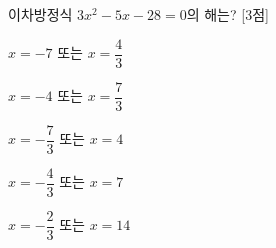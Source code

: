 이차방정식 $3x^2-5x-28=0$의 해는? \mbox{[3점]}
\begin{choicesii}{\rule[-3ex]{0pt}{8ex}$x=-7$ 또는 $x=\dfrac{4}{3}$}{\rule[-3ex]{0pt}{8ex}$x=-4$ 또는 $x=\dfrac{7}{3}$}{\rule[-3ex]{0pt}{8ex}$x=-\dfrac{7}{3}$ 또는 $x=4$}{\rule[-3ex]{0pt}{8ex}$x=-\dfrac{4}{3}$ 또는 $x=7$}{\rule[-3ex]{0pt}{8ex}$x=-\dfrac{2}{3}$ 또는 $x=14$}\end{choicesii}
